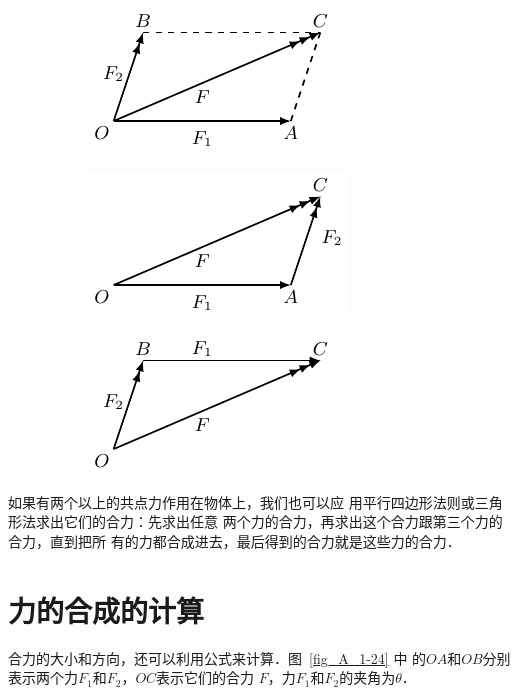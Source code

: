 \begin{figure} [htp]
	\centering
	\begin{subfigure} {1\linewidth} 
		\centering
		\includegraphics{fig/A/1-23a.pdf} 
		\caption{} \label{fig_A_1-23a} 
	\end{subfigure} 
	\begin{subfigure} {0.45\linewidth} 
		\centering
		\includegraphics{fig/A/1-23b.pdf} 
		\caption{} \label{fig_A_1-23b} 
	\end{subfigure} 
	\begin{subfigure} {0.45\linewidth} 
		\centering
		\includegraphics{fig/A/1-23c.pdf} 
		\caption{} \label{fig_A_1-23c} 
	\end{subfigure} 
	\caption{} \label{fig_A_1-23} 
\end{figure} 

    如果有两个以上的共点力作用在物体上，我们也可以应
用平行四边形法则或三角形法求出它们的合力：先求出任意
两个力的合力，再求出这个合力跟第三个力的合力，直到把所
有的力都合成进去，最后得到的合力就是这些力的合力．

\section{力的合成的计算} 
    合力的大小和方向，还可以利用公式来计算．图~\ref{fig_A_1-24} 中
的$OA$和$OB$分别表示两个力$F_1$和$F_2$，$OC$表示它们的合力
$F$，力$F_1$和$F_2$的夹角为$\theta$．

